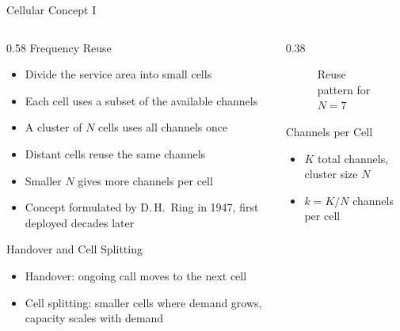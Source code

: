 \begin{frame}{Cellular Concept I}
  \begin{columns}[T,onlytextwidth]
    \begin{column}{0.58\textwidth}
      Frequency Reuse
      \begin{itemize}
        \item Divide the service area into small cells
        \item Each cell uses a subset of the available channels
        \item A cluster of $N$ cells uses all channels once
        \item Distant cells reuse the same channels
        \item Smaller $N$ gives more channels per cell
        \item Concept formulated by D.\,H.\ Ring in 1947, first deployed decades later
      \end{itemize}
      \vspace{0.4em}
      Handover and Cell Splitting
      \begin{itemize}
        \item Handover: ongoing call moves to the next cell
        \item Cell splitting: smaller cells where demand grows, capacity scales with demand
      \end{itemize}
    \end{column}
    \begin{column}{0.38\textwidth}
      \begin{figure}
        \centering
        
        \caption{Reuse pattern for $N=7$}
      \end{figure}
      \begin{block}{Channels per Cell}
        \begin{itemize}
          \item $K$ total channels, cluster size $N$\\
          \item $k = K/N$ channels per cell
        \end{itemize}
      \end{block}
    \end{column}
  \end{columns}
\end{frame}

